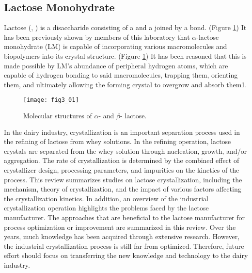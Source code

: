 \begin{refsection}
\subsection{Lactose Monohydrate}

Lactose (,
) is a disaccharide consisting of a  and a
 joined by a  bond. (Figure
\ref{fig:lactose-structure})  It has been previously shown by members of this
laboratory that $\alpha$-lactose monohydrate (LM) is capable of incorporating
various macromolecules and biopolymers into its crystal
structure\cite{Wang2001a,Kurimoto1999}. (Figure \ref{fig:lactose-structure}) It
has been reasoned that this is made possible by LM's abundance of peripheral
hydrogen atoms, which are capable of hydrogen bonding to said macromolecules,
trapping them, orienting them, and ultimately allowing the forming crystal to
overgrow and absorb them1.

\begin{figure}[h!] \centering \texttt{[image: fig3\_01]}
    \caption[Molecular structures of $\alpha$- and $\beta$- lactose.]{Molecular
    structures of $\alpha$- and $\beta$- lactose.}
    \label{fig:lactose-structure}
\end{figure}

In the dairy industry, crystallization is an important separation
process used in the refining of lactose from whey solutions. In the refining
operation, lactose crystals are separated from the whey solution through
nucleation, growth, and/or aggregation. The rate of crystallization is
determined by the combined effect of crystallizer design, processing
parameters, and impurities on the kinetics of the process. This review
summarizes studies on lactose crystallization, including the mechanism, theory
of crystallization, and the impact of various factors affecting the
crystallization kinetics. In addition, an overview of the industrial
crystallization operation highlights the problems faced by the lactose
manufacturer. The approaches that are beneficial to the lactose manufacturer
for process optimization or improvement are summarized in this review. Over the
years, much knowledge has been acquired through extensive research. However,
the industrial crystallization process is still far from optimized. Therefore,
future effort should focus on transferring the new knowledge and technology to
the dairy industry.


\end{refsection}
